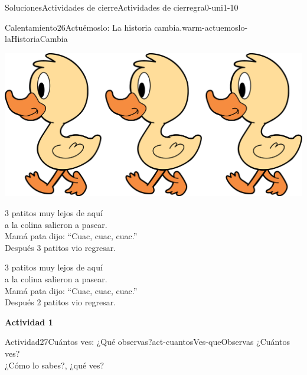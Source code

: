 \documentclass[twoside,10pt,]{article}
\begin{document}
\begin{solutions-section}{Soluciones}{Actividades de cierre}{}{Actividades de cierre}{}{}{gra0-uni1-10}
\begin{explorationsolution}{Calentamiento}{26}{Actuémoslo: La historia cambia.}{warm-actuemoslo-laHistoriaCambia}
\begin{image}{0.2}{0.6}{0.2}{}
\includegraphics[width=\linewidth]{external/png-source/3 ducks.png}
\end{image}%
%
\par
3 patitos muy lejos de aquí\\
 a la colina salieron a pasear.\\
 Mamá pata dijo: “Cuac, cuac, cuac.”\\
 Después 3 patitos vio regresar.%
\par
3 patitos muy lejos de aquí\\
 a la colina salieron a pasear.\\
 Mamá pata dijo: “Cuac, cuac, cuac.”\\
 Después 2 patitos vio regresar.%
\end{explorationsolution}%
\par\medskip
\noindent\textbf{\large{}\space\textperiodcentered\space{}Actividad 1}
\begin{activitysolution}{Actividad}{27}{Cuántos ves: ¿Qué observas?}{act-cuantosVes-queObservas}%
¿Cuántos ves?\\
 ¿Cómo lo sabes?, ¿qué ves?%
\begin{sidebyside}{2}{0}{0}{0}%
\begin{sbspanel}{0.5}%

\end{sbspanel}
\end{sidebyside}
\end{activitysolution}
\end{solutions-section}
\end{document}
